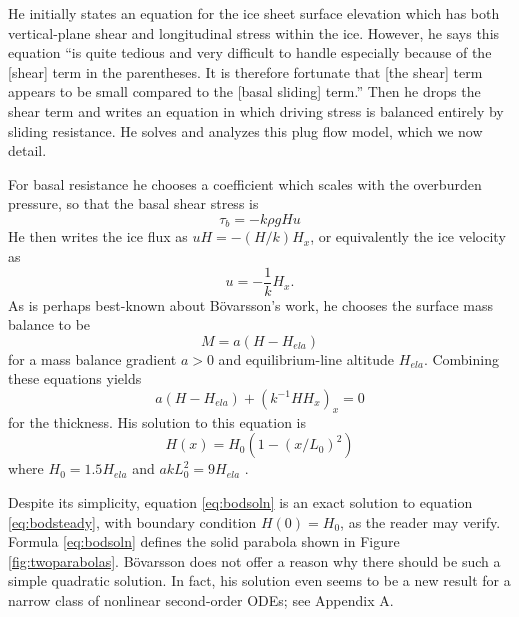 \documentclass[review,letterpaper]{igs}
\renewcommand{\dh}{\fontencoding{T1}\selectfont{\symbol{240}}}
\newcommand{\bod}{B\"o\dh varsson\xspace}
\begin{document}
He initially states an equation for the ice sheet surface elevation which has both vertical-plane shear and longitudinal stress within the ice.  However, he says this equation ``is quite tedious and very difficult to handle especially because of the [shear] term in the parentheses.  It is therefore fortunate that [the shear] term appears to be small compared to the [basal sliding] term.''  Then he drops the shear term and writes an equation in which driving stress is balanced entirely by sliding resistance.  He solves and analyzes this plug flow model, which we now detail.

For basal resistance he chooses a coefficient which scales with the overburden pressure, so that the basal shear stress is
\begin{equation}
\tau_b = - k \rho g H u  \label{eq:bodstresschoice}
\end{equation}
He then writes the ice flux as $uH=-(H/k) H_x$, or equivalently the ice velocity as
\begin{equation}
u = - \frac{1}{k} H_x. \label{eq:bodvelocity}
\end{equation}
As is perhaps best-known about \bod's work, he chooses the surface mass balance to be
\begin{equation}
M = a (H - H_{ela})  \label{eq:bodmassbalance}
\end{equation}
for a mass balance gradient $a>0$ and equilibrium-line altitude $H_{ela}$.  Combining these equations yields \citep[equation (17)]{Bodvardsson}
\begin{equation}
a (H - H_{ela}) + (k^{-1} H H_x)_x = 0  \label{eq:bodsteady}
\end{equation}
for the thickness.  His solution to this equation is \citep[equivalent equations (18) and (23)]{Bodvardsson}
\begin{equation}
H(x) = H_0 (1 - (x/L_0)^2)  \label{eq:bodsoln}
\end{equation}
where $H_0 = 1.5 H_{ela}$ and $a k L_0^2 = 9 H_{ela}$ \citep[equation (24)]{Bodvardsson}.

Despite its simplicity, equation \eqref{eq:bodsoln} is an exact solution to equation \eqref{eq:bodsteady}, with boundary condition $H(0)=H_0$, as the reader may verify.  Formula \eqref{eq:bodsoln} defines the solid parabola shown in Figure \ref{fig:twoparabolas}.  \bod does not offer a reason why there should be such a simple quadratic solution.  In fact, his solution even seems to be a new result for a narrow class of nonlinear second-order ODEs; see Appendix A.
\end{document}
